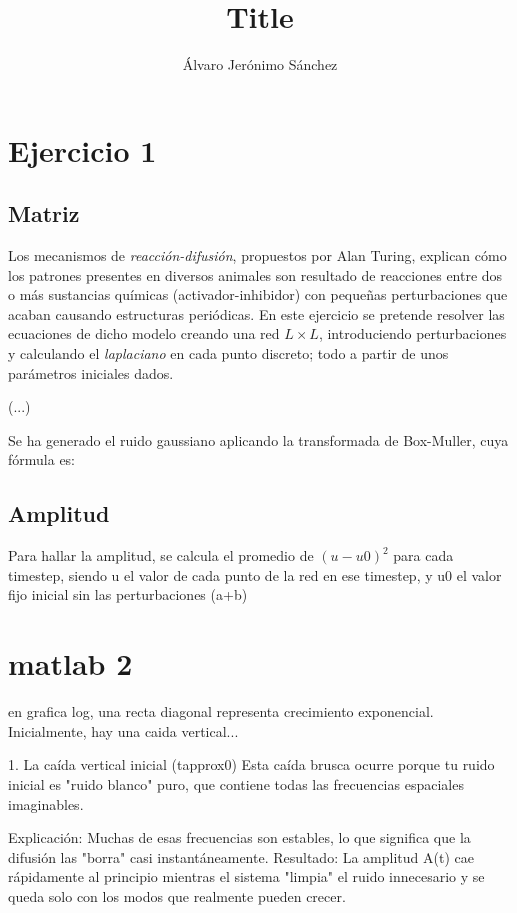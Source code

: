 \documentclass[]{article}
\title{\vspace{-1.8cm} Title}
\author{Álvaro Jerónimo Sánchez}
\date{}
\begin{document}
\maketitle
\setcounter{section}{0}
\renewcommand{\tablename}{Tabla}


\section{Ejercicio 1}

\subsection{Matriz}

Los mecanismos de \textit{reacción-difusión}, propuestos por Alan Turing, explican cómo los patrones presentes en diversos animales son resultado de reacciones entre dos o más sustancias químicas (activador-inhibidor) con pequeñas perturbaciones que acaban causando estructuras periódicas. En este ejercicio se pretende resolver las ecuaciones de dicho modelo creando una red $L \times L$, introduciendo perturbaciones y calculando el \textit{laplaciano} en cada punto discreto; todo a partir de unos parámetros iniciales dados.

(...)

Se ha generado el ruido gaussiano aplicando la transformada de Box-Muller, cuya fórmula es: 

\subsection{Amplitud}

Para hallar la amplitud, se calcula el promedio de $(u-u0)^2$ para cada timestep, siendo u el valor de cada punto de la red en ese timestep, y u0 el valor fijo inicial sin las perturbaciones (a+b)

\section{matlab 2}

en grafica log, una recta diagonal representa crecimiento exponencial. Inicialmente, hay una caida vertical... 

1. La caída vertical inicial (tapprox0)
Esta caída brusca ocurre porque tu ruido inicial es "ruido blanco" puro, que contiene todas las frecuencias espaciales imaginables.

    Explicación: Muchas de esas frecuencias son estables, lo que significa que la difusión las "borra" casi instantáneamente.
    Resultado: La amplitud A(t) cae rápidamente al principio mientras el sistema "limpia" el ruido innecesario y se queda solo con los modos que realmente pueden crecer.
\end{document}
